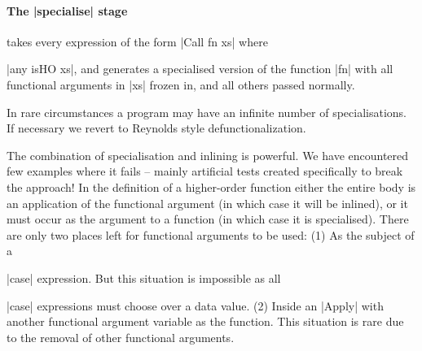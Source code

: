 \paragraph{The |specialise| stage} takes every expression of the form |Call fn xs| where \ignore|any isHO xs|, and generates a specialised version of the function |fn| with all functional arguments in |xs| frozen in, and all others passed normally.

In rare circumstances a program may have an infinite number of specialisations. If necessary we revert to Reynolds style defunctionalization.

The combination of specialisation and inlining is powerful. We have encountered few examples where it fails -- mainly artificial tests created specifically to break the approach! In the definition of a higher-order function either the entire body is an application of the functional argument (in which case it will be inlined), or it must occur as the argument to a function (in which case it is specialised). There are only two places left for functional arguments to be used: (1) As the subject of a \ignore|case| expression. But this situation is impossible as all \ignore|case| expressions must choose over a data value. (2) Inside an |Apply| with another functional argument variable as the function. This situation is rare due to the removal of other functional arguments.

